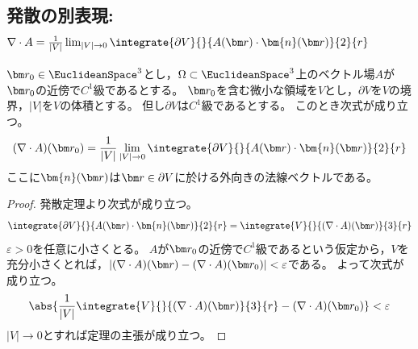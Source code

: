         \subsection{発散の別表現: \texorpdfstring{$\nabla\cdot A = \frac{1}{|V|}\lim_{|V|\to 0} \integrate{\partial V}{}{A(\vr)\cdot\bm{n}(\vr)}{2}{r}$}{発散はベクトル場の法線面積分の体積の商の極限である}}
            \begin{shadebox}
                $\vr_0\in\EuclideanSpace^3$とし，$\Omega\subset\EuclideanSpace^3$上のベクトル場$A$が$\vr_0$の近傍で$C^1$級であるとする。
                $\vr_0$を含む微小な領域を$V$とし，$\partial V$を$V$の境界，$|V|$を$V$の体積とする。
                但し$\partial V$は$C^1$級であるとする。
                このとき次式が成り立つ。
                \[ (\nabla\cdot A)(\vr_0) = \frac{1}{|V|}\lim_{|V|\to 0}\integrate{\partial V}{}{A(\vr)\cdot\bm{n}(\vr)}{2}{r} \]
                ここに$\bm{n}(\vr)$は$\vr\in\partial V$に於ける外向きの法線ベクトルである。
            \end{shadebox}
            \begin{proof}
                発散定理より次式が成り立つ。
                \[ \integrate{\partial V}{}{A(\vr)\cdot\bm{n}(\vr)}{2}{r} = \integrate{V}{}{(\nabla\cdot A)(\vr)}{3}{r} \]
                $\varepsilon>0$を任意に小さくとる。
                $A$が$\vr_0$の近傍で$C^1$級であるという仮定から，$V$を充分小さくとれば，$|(\nabla\cdot A)(\vr) - (\nabla\cdot A)(\vr_0)| < \varepsilon$である。
                よって次式が成り立つ。
                \[ \abs{ \frac{1}{|V|}\integrate{V}{}{(\nabla\cdot A)(\vr)}{3}{r} - (\nabla\cdot A)(\vr_0) } < \varepsilon \]
                $|V|\to 0$とすれば定理の主張が成り立つ。
            \end{proof}
